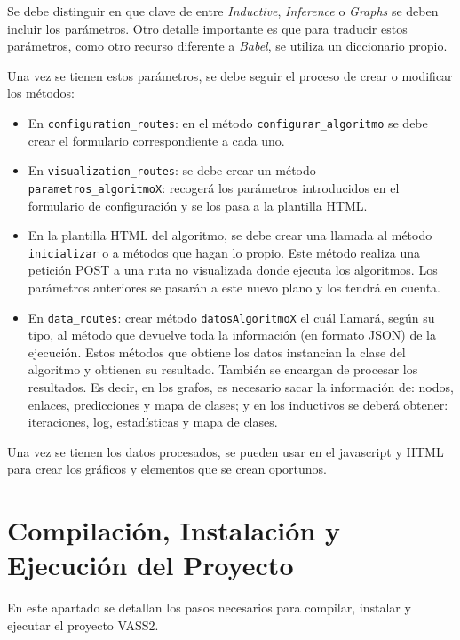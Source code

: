 
Se debe distinguir en que clave de entre \textit{Inductive}, \textit{Inference} o \textit{Graphs} se deben incluir los parámetros. Otro detalle importante es que para traducir estos parámetros, como otro recurso diferente a \textit{Babel}, se utiliza un diccionario propio.

Una vez se tienen estos parámetros, se debe seguir el proceso de crear o modificar los métodos:
\begin{itemize}
	\item En \texttt{configuration\_routes}: en el método \texttt{configurar\_algoritmo} se debe crear el formulario correspondiente a cada uno.
	\item  En \texttt{visualization\_routes}: se debe crear un método \texttt{parametros\_algoritmoX}: recogerá los parámetros introducidos en el formulario de configuración y se los pasa a la plantilla HTML.
	\item En la plantilla HTML del algoritmo, se debe crear una llamada al método \texttt{inicializar} o a métodos que hagan lo propio. Este método realiza una petición POST a una ruta no visualizada donde ejecuta los algoritmos. Los parámetros anteriores se pasarán a este nuevo plano y los tendrá en cuenta.
	\item En \texttt{data\_routes}: crear método \texttt{datosAlgoritmoX} el cuál llamará, según su tipo, al método que devuelve toda la información (en formato JSON) de la ejecución. Estos métodos que obtiene los datos instancian la clase del algoritmo y obtienen su resultado. También se encargan de procesar los resultados. Es decir, en los grafos, es necesario sacar la información de: nodos, enlaces, predicciones y mapa de clases; y en los inductivos se deberá obtener: iteraciones, log, estadísticas y mapa de clases.
\end{itemize}

Una vez se tienen los datos procesados, se pueden usar en el javascript y HTML para crear los gráficos y elementos que se crean oportunos.

\section{Compilación, Instalación y Ejecución del Proyecto}

En este apartado se detallan los pasos necesarios para compilar, instalar y ejecutar el proyecto VASS2.

